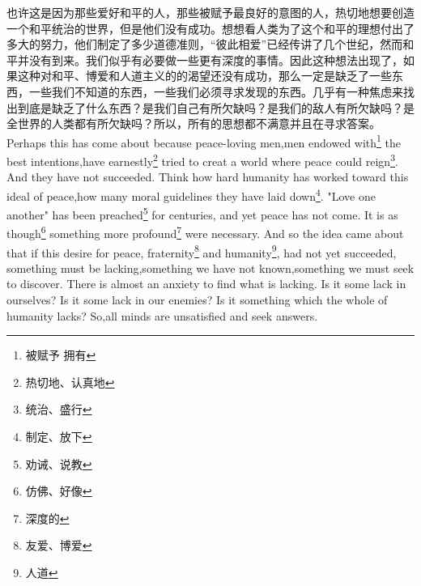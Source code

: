 \documentclass[lang=cn,10pt]{elegantbook}
\begin{document}
\begin{tcolorbox}[title=译文,
colback=red!5!white,
colframe=red!75!black,
fonttitle=\bfseries]
也许这是因为那些爱好和平的人，那些被赋予最良好的意图的人，热切地想要创造一个和平统治的世界，但是他们没有成功。想想看人类为了这个和平的理想付出了多大的努力，他们制定了多少道德准则，“彼此相爱”已经传讲了几个世纪，然而和平并没有到来。我们似乎有必要做一些更有深度的事情。因此这种想法出现了，如果这种对和平、博爱和人道主义的的渴望还没有成功，那么一定是缺乏了一些东西，一些我们不知道的东西，一些我们必须寻求发现的东西。几乎有一种焦虑来找出到底是缺乏了什么东西？是我们自己有所欠缺吗？是我们的敌人有所欠缺吗？是全世界的人类都有所欠缺吗？所以，所有的思想都不满意并且在寻求答案。
Perhaps this has come about because peace-loving men,men endowed with\footnote{被赋予 拥有} the best intentions,have earnestly\footnote{热切地、认真地} tried to creat a world where peace could reign\footnote{统治、盛行}. And they have not succeeded. Think how hard humanity has worked toward this ideal of peace,how many moral guidelines they have laid down\footnote{制定、放下}. "Love one another" has been preached\footnote{劝诫、说教} for centuries, and yet peace has not come. It is as though\footnote{仿佛、好像} something more profound\footnote{深度的} were necessary. And so the idea came about that if this desire for peace, fraternity\footnote{友爱、博爱} and humanity\footnote{人道}, had not yet succeeded, something must be lacking,something we have not known,something we must seek to discover. There is almost an anxiety to find what is lacking. Is it some lack in ourselves? Is it some lack in our enemies? Is it something which the whole of humanity lacks? So,all minds are unsatisfied and seek answers.
\end{tcolorbox}
\end{document}
